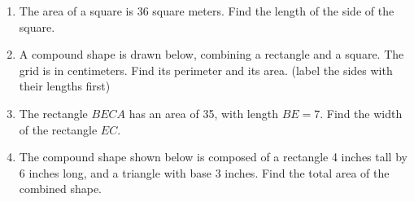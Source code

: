 \begin{enumerate}
\item The area of a square is 36 square meters. Find the length of the side of the square.

\newpage
\item A compound shape is drawn below, combining a rectangle and a square. The grid is in centimeters. Find its perimeter and its area. (label the sides with their lengths first)
    \begin{flushleft}
    \end{flushleft} \vspace{1cm} 

\item The rectangle $BECA$ has an area of 35, with length $BE=7$. Find the width of the rectangle $EC$. \par

\item The compound shape shown below is composed of a rectangle 4 inches tall by 6 inches long, and a triangle with base 3 inches. Find the total area of the combined shape.\vspace{0.5cm} 
  \begin{flushleft}
  \end{flushleft}


\end{enumerate}
